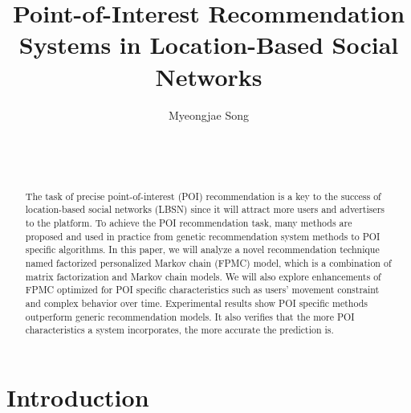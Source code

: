 \documentclass{sig-alternate}
\begin{document}

\title{Point-of-Interest Recommendation Systems in Location-Based Social Networks}


\author{
\alignauthor
Myeongjae Song\\
	\\
	\\
	\\
}

\maketitle
\begin{abstract}
The task of precise point-of-interest (POI) recommendation is a key to the success of 
location-based social networks (LBSN) since it will attract more users and advertisers 
to the platform. To achieve the POI recommendation task, many methods are proposed 
and used in practice from genetic recommendation system methods to POI specific 
algorithms. In this paper, we will analyze a novel recommendation technique named 
factorized personalized Markov chain (FPMC) model, which is a combination of matrix 
factorization and Markov chain models. We will also explore enhancements of FPMC 
optimized for POI specific characteristics such as users' movement constraint and 
complex behavior over time. Experimental results show POI specific methods outperform 
generic recommendation models. It also verifies that the more POI characteristics a system incorporates, 
the more accurate the prediction is.
\end{abstract}



\section{Introduction}
\label{sec:introduction}
\end{document}

